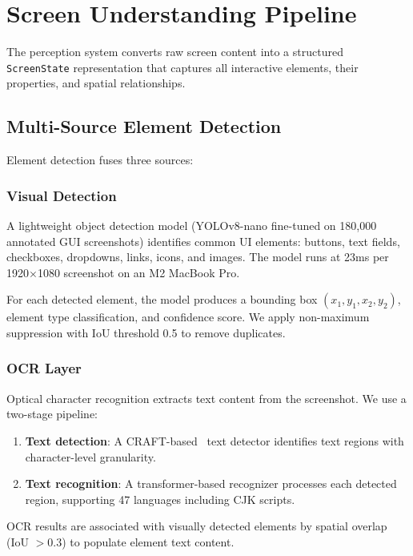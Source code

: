 \section{Screen Understanding Pipeline}

\label{sec:perception}

The perception system converts raw screen content into a structured \texttt{ScreenState} representation that captures all interactive elements, their properties, and spatial relationships.

\subsection{Multi-Source Element Detection}

Element detection fuses three sources:

\subsubsection{Visual Detection}

A lightweight object detection model (YOLOv8-nano fine-tuned on 180,000 annotated GUI screenshots) identifies common UI elements: buttons, text fields, checkboxes, dropdowns, links, icons, and images. The model runs at 23ms per 1920$\times$1080 screenshot on an M2 MacBook Pro.

For each detected element, the model produces a bounding box $(x_1, y_1, x_2, y_2)$, element type classification, and confidence score. We apply non-maximum suppression with IoU threshold 0.5 to remove duplicates.

\subsubsection{OCR Layer}

Optical character recognition extracts text content from the screenshot. We use a two-stage pipeline:

\begin{enumerate}[leftmargin=*]
    \item \textbf{Text detection}: A CRAFT-based~\cite{baek2019craft} text detector identifies text regions with character-level granularity.
    \item \textbf{Text recognition}: A transformer-based recognizer processes each detected region, supporting 47 languages including CJK scripts.
\end{enumerate}

OCR results are associated with visually detected elements by spatial overlap (IoU $> 0.3$) to populate element text content.

